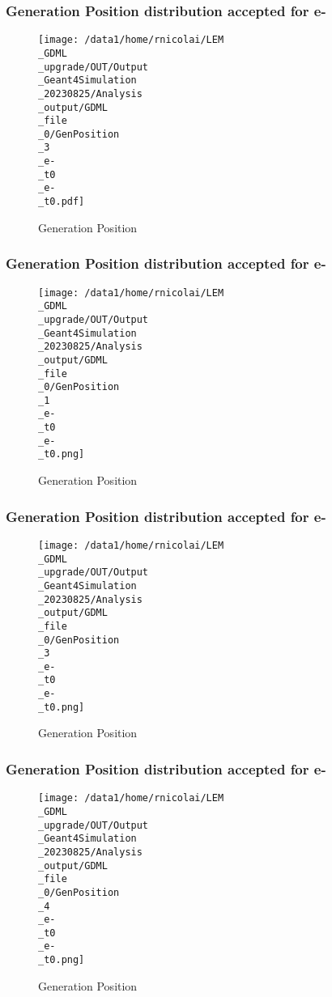 \documentclass[8pt]{beamer}
\begin{document}
            \begin{frame}
                \frametitle{Generation Position distribution accepted for e-}
            
        \begin{figure}[h]
            \centering
            \texttt{[image: /data1/home/rnicolai/LEM\\\_GDML\\\_upgrade/OUT/Output\\\_Geant4Simulation\\\_20230825/Analysis\\\_output/GDML\\\_file\\\_0/GenPosition\\\_3\\\_e-\\\_t0\\\_e-\\\_t0.pdf]}
            \caption{Generation Position}
        \end{figure}
        
            \end{frame}
            
            \begin{frame}
                \frametitle{Generation Position distribution accepted for e-}
            
        \begin{figure}[h]
            \centering
            \texttt{[image: /data1/home/rnicolai/LEM\\\_GDML\\\_upgrade/OUT/Output\\\_Geant4Simulation\\\_20230825/Analysis\\\_output/GDML\\\_file\\\_0/GenPosition\\\_1\\\_e-\\\_t0\\\_e-\\\_t0.png]}
            \caption{Generation Position}
        \end{figure}
        
            \end{frame}
            
            \begin{frame}
                \frametitle{Generation Position distribution accepted for e-}
            
        \begin{figure}[h]
            \centering
            \texttt{[image: /data1/home/rnicolai/LEM\\\_GDML\\\_upgrade/OUT/Output\\\_Geant4Simulation\\\_20230825/Analysis\\\_output/GDML\\\_file\\\_0/GenPosition\\\_3\\\_e-\\\_t0\\\_e-\\\_t0.png]}
            \caption{Generation Position}
        \end{figure}
        
            \end{frame}
            
            \begin{frame}
                \frametitle{Generation Position distribution accepted for e-}
            
        \begin{figure}[h]
            \centering
            \texttt{[image: /data1/home/rnicolai/LEM\\\_GDML\\\_upgrade/OUT/Output\\\_Geant4Simulation\\\_20230825/Analysis\\\_output/GDML\\\_file\\\_0/GenPosition\\\_4\\\_e-\\\_t0\\\_e-\\\_t0.png]}
            \caption{Generation Position}
        \end{figure}
        
            \end{frame}
            
\end{document}

